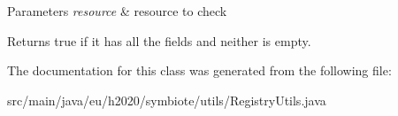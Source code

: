 \begin{DoxyParams}{Parameters}
{\em resource} & resource to check \\
\hline
\end{DoxyParams}
\begin{DoxyReturn}{Returns}
true if it has all the fields and neither is empty. 
\end{DoxyReturn}


The documentation for this class was generated from the following file\+:\begin{DoxyCompactItemize}
\item 
src/main/java/eu/h2020/symbiote/utils/Registry\+Utils.\+java\end{DoxyCompactItemize}
